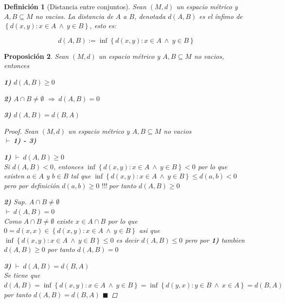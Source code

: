\documentclass[oneside]{book} %
\theoremstyle{Teorema}
\newtheorem{Definicion}{Definición}[chapter]
\newtheorem{Proposicion}[Definicion]{Proposición}
\theoremstyle{Ejemplos}
\theoremstyle{[Obs]}
\renewcommand{\{}{\left\lbrace} %
\renewcommand{\}}{\right\rbrace} %
\newcommand{\y}{\ \wedge\ } %
\newcommand{\n}{\cap} %
\renewcommand{\sc}{\subseteq} %
\renewcommand{\qed}{$\blacksquare$} %
\newcommand{\pd}{$\vdash\ $} %
\renewcommand{\c}{$!!!\ $} %
\newcommand{\Imp}{$\Rightarrow\ $} %
\begin{document}
			\begin{Definicion}[Distancia entre conjuntos]\setlength{\parindent}{0em}
				
				Sean $(M, d)$ un espacio métrico y $A, B \sc M$ no vacios. La distancia de $A$ a $B$, denotada $d(A, B)$ es el ínfimo de $\{ d(x, y) : x \in A \y y \in B \}$, esto es: 

				\[ d(A, B) := \inf\{ d(x, y) : x \in A \y y \in B \} \] 

			\end{Definicion}

			\begin{Proposicion}\setlength{\parindent}{0em}
				
				Sean $(M, d)$ un espacio métrico y $A, B \sc M$ no vacios, entonces 
				
				\textbf{1)} $d(A, B) \geq 0$ 

				\textbf{2)} $A \n B \neq \emptyset$ \Imp $d(A, B) = 0$ 

				\textbf{3)} $d(A, B) = d(B, A)$ 

				\begin{proof}
					
					Sean $(M, d)$ un espacio métrico y $A, B \sc M$ no vacios \\
					\pd \textbf{1) - 3)}

					\textbf{1)} \pd $d(A, B) \geq 0$ \\
					Si $d(A, B) < 0$, entonces $\inf\{ d(x, y) : x \in A \y y \in B \} < 0$ por lo que existen $a \in A$ y $b \in B$ tal que $\inf\{ d(x, y) : x \in A \y y \in B \} \leq d(a, b) < 0$ pero por definición $d(a, b) \geq 0$ \c por tanto $d(A, B) \geq 0$

					\textbf{2)} Sup. $A \n B \neq \emptyset$ \\
					\pd $d(A, B) = 0$ \\
					Como $A \n B \neq \emptyset$ existe $x \in A \n B$ por lo que $0 = d(x, x) \in \{ d(x, y) : x \in A \y y \in B \}$ asi que $\inf\{ d(x, y) : x \in A \y y \in B \} \leq 0$ es decir $d(A, B) \leq 0$ pero por \textbf{1)} tambien $d(A, B) \geq 0$ por tanto $d(A, B) = 0$

					\textbf{3)} \pd $d(A, B) = d(B, A)$ \\
					Se tiene que $d(A, B) = \inf\{ d(x, y) : x \in A \y y \in B \} = \inf\{ d(y, x) : y \in B \y x \in A \} = d(B, A)$ por tanto $d(A, B) = d(B, A)$ \qed
					
				\end{proof}

			\end{Proposicion}
\end{document}
